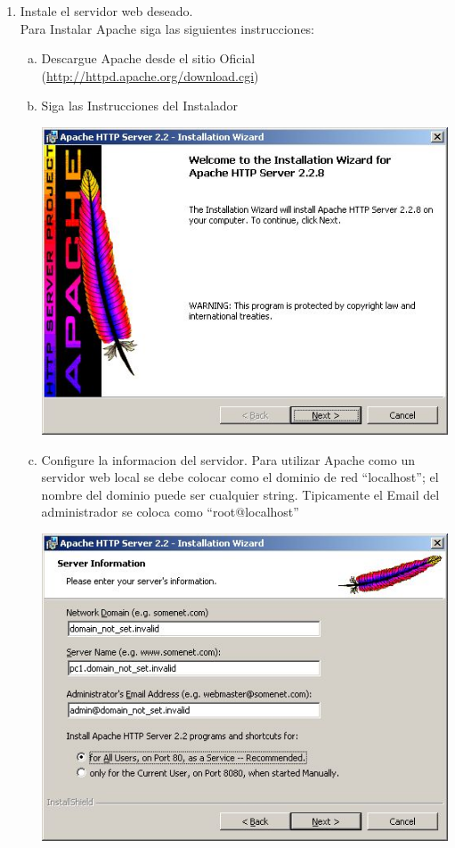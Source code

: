\documentclass[11pt]{article} %
\begin{document}
\begin{enumerate}
\item Instale el servidor web deseado.\\
Para Instalar Apache siga las siguientes instrucciones:
\begin{enumerate}[a)]
\item Descargue Apache desde el sitio Oficial (\url{http://httpd.apache.org/download.cgi})
\item Siga las Instrucciones del Instalador
\begin{center}
\includegraphics[scale=0.7]{Imagenes/Apache01.jpg}
\end{center}
\item Configure la informacion del servidor. Para utilizar Apache como un servidor web local se debe colocar  como el dominio de red ``localhost''; el nombre del dominio puede ser cualquier string. Tipicamente el Email del administrador se coloca como ``root@localhost''
\begin{center}
\includegraphics[scale=0.7]{Imagenes/Apache02.jpg}

\end{center}
\end{enumerate}
\end{enumerate}
\end{document}
